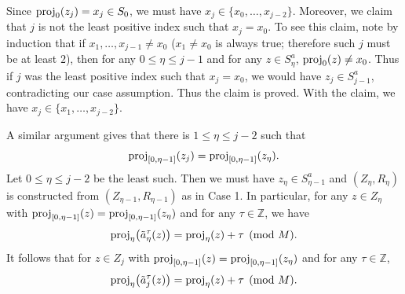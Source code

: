 \documentclass[11pt]{amsart}
\theoremstyle{definition}
\theoremstyle{definition}
\numberwithin{equation}{section}
\begin{document}
Since $\mbox{\rm proj}_0(z_j)=x_j\in S_0$, we must have $x_j\in \{x_0, \dots, x_{j-2}\}$. Moreover, we claim that $j$ is not the least positive index such that $x_j=x_0$. To see this claim, note by induction that if $x_1, \dots, x_{j-1}\neq x_0$ ($x_1\neq x_0$ is always true; therefore such $j$ must be at least $2$), then for any $0\leq \eta\leq j-1$ and for any $z\in S_\eta^a$, $\mbox{\rm proj}_0(z)\neq x_0$. Thus if $j$ was the least positive index such that $x_j=x_0$, we would have $z_j\in S_{j-1}^a$, contradicting our case assumption. Thus the claim is proved. With the claim, we have $x_j\in \{x_1, \dots, x_{j-2}\}$.

A similar argument gives that there is $1\leq \eta\leq j-2$ such that 
\begin{equation}\label{eqn:criterion}\mbox{\rm proj}_{[0,\eta-1]}(z_j)=\mbox{\rm proj}_{[0,\eta-1]}(z_\eta). \end{equation} Let $0\leq \eta\leq j-2$ be the least such. Then we must have $z_\eta\in S_{\eta-1}^a$ and $(Z_\eta, R_\eta)$ is constructed from $(Z_{\eta-1}, R_{\eta-1})$ as in Case 1. In particular, for any $z\in Z_\eta$ with $\mbox{\rm proj}_{[0,\eta-1]}(z)=\mbox{\rm proj}_{[0,\eta-1]}(z_\eta)$ and for any $\tau\in \mathbb{Z}$, we have 
$$\mbox{\rm proj}_\eta\big(\tilde{a}_\eta^\tau(z)\big)=\mbox{\rm proj}_\eta(z)+\tau\pmod{M}.$$It follows that for $z\in Z_j$ with $\mbox{\rm proj}_{[0,\eta-1]}(z)=\mbox{\rm proj}_{[0, \eta-1]}(z_\eta)$ and for any $\tau\in \mathbb{Z}$, 
$$\mbox{\rm proj}_\eta\big(\tilde{a}_j^\tau(z)\big)=\mbox{\rm proj}_\eta(z)+\tau\pmod{M}.$$
\end{document}
